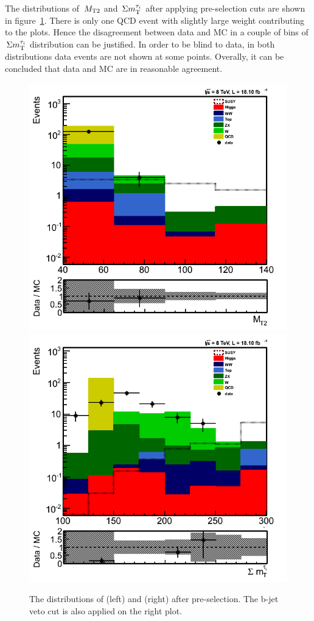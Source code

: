 The distributions of $\,{M_{\rm T2}}$ and $\,\Sigma m_{\rm T}^{\tau_i}$ after applying pre-selection cuts are shown in figure~\ref{fig:comparison}. There is only one QCD event with slightly large weight contributing to the plots. Hence the disagreement between data and MC in a couple of bins of $\,\Sigma m_{\rm T}^{\tau_i}$ distribution can be justified. In order to be blind to data, in both distributions data events are not shown at some points. Overally, it can be concluded that data and MC are in reasonable agreement. 
\begin{figure}[htbp]
\centering
\includegraphics[angle=0,scale=0.35]{TauTauFigs/MT2_preSel.png}
\includegraphics[angle=0,scale=0.35]{TauTauFigs/SumMT_preSel.png} \\
\caption{The distributions of \mttwo (left) and \SumMT (right) after pre-selection. The b-jet veto cut is also applied on the right plot.}
\label{fig:comparison}
\end{figure}

